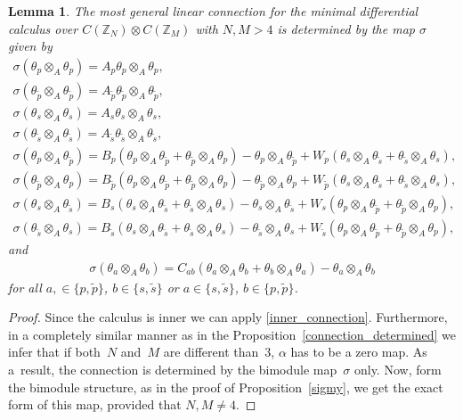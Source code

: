 \documentclass[pdftex]{sigma}
\numberwithin{equation}{section}
\newtheorem{Lemma}[Theorem]{Lemma}
\newcommand{\Z}{\mathbb{Z}}
\newcommand{\ip}{{\tilde{p}}}
\newcommand{\is}{{\tilde{s}}}
\begin{document}
\begin{Lemma}The most general linear connection for the minimal differential calculus over
$C(\Z_N) \otimes C(\Z_M)$ with $N,M>4$ is determined by the map $\sigma$ given by
\begin{gather*}
\sigma(\theta_p \otimes_A \theta_p) = A_p \theta_p \otimes_A \theta_p, \\
\sigma(\theta_\ip \otimes_A \theta_\ip) = A_\ip \theta_\ip \otimes_A \theta_\ip, \\
\sigma(\theta_s \otimes_A \theta_s) = A_s \theta_s \otimes_A \theta_s, \\
\sigma(\theta_\is \otimes_A \theta_\is) = A_\is \theta_\is \otimes_A \theta_\is, \\
\sigma(\theta_p \otimes_A \theta_\ip) = B_p \left( \theta_p \otimes_A \theta_\ip + \theta_\ip \otimes_A \theta_p \right) - \theta_p \otimes_A \theta_\ip + W_{p} (\theta_s\otimes_A\theta_{\is}+\theta_{\is}\otimes_A\theta_s), \\
\sigma(\theta_\ip \otimes_A \theta_p) = B_\ip \left( \theta_p \otimes_A \theta_\ip + \theta_\ip \otimes_A \theta_p \right) - \theta_\ip \otimes_A \theta_p + W_{\ip} (\theta_s\otimes_A\theta_{\is}+\theta_{\is}\otimes_A\theta_s), \\
\sigma(\theta_s \otimes_A \theta_\is) = B_s \left( \theta_s \otimes_A \theta_\is + \theta_\is \otimes_A \theta_s \right) - \theta_s \otimes_A \theta_\is + W_{s} (\theta_p\otimes_A\theta_{\ip}+\theta_{\ip}\otimes_A\theta_p), \\
\sigma(\theta_\is \otimes_A \theta_s) = B_\is \left( \theta_s \otimes_A \theta_\is + \theta_\is \otimes_A \theta_s \right) - \theta_\is \otimes_A \theta_s + W_{\is} (\theta_p\otimes_A\theta_{\ip}+\theta_{\ip}\otimes_A\theta_p),
\end{gather*}
and
\begin{gather*}
 \sigma(\theta_a \otimes_A \theta_b) = C_{ab} (\theta_a\otimes_A\theta_b+\theta_b\otimes_A\theta_a)-\theta_a\otimes_A\theta_b
\end{gather*}
for all $a,\in\{p,\ip \}$, $b \in \{ s,\is\}$ or $ a \in \{ s,\is\}$, $b \in\{p,\ip \}$.
\end{Lemma}
\begin{proof}Since the calculus is inner we can apply \eqref{inner_connection}. Furthermore, in a completely similar manner as in the Proposition~\ref{connection_determined} we infer that if both~$N$ and~$M$ are different than~$3$, $\alpha$ has to be a zero map. As a~result, the connection is determined by the bimodule map~$\sigma$ only. Now, form the bimodule structure, as in the proof of Proposition~\ref{sigmy}, we get the exact form of this map, provided that $N,M\neq 4$.
\end{proof}
\end{document}
